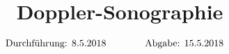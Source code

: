 
\setmainfont{Comic Sans MS}

\subject{US3}
\title{Doppler-Sonographie}

\date{
  \begin{align}
    \text{Durchführung: } & \text{8.5.2018} & \hspace{3em} & \text{Abgabe: 15.5.2018} \notag
  \end{align}
}




\maketitle
\thispagestyle{empty}
\tableofcontents
\newpage






\nocite{*}
\printbibliography{}


